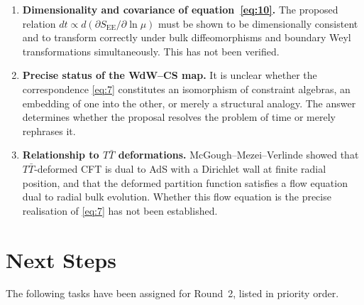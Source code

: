 \documentclass[11pt,a4paper]{article}
\begin{document}
\begin{enumerate}
  \item \textbf{Dimensionality and covariance of equation~\eqref{eq:10}.}
    The proposed relation $dt \propto d(\partial S_{\text{EE}}/\partial\ln\mu)$
    must be shown to be dimensionally consistent and to transform correctly
    under bulk diffeomorphisms and boundary Weyl transformations simultaneously.
    This has not been verified.

  \item \textbf{Precise status of the WdW--CS map.}
    It is unclear whether the correspondence \eqref{eq:7} constitutes an
    isomorphism of constraint algebras, an embedding of one into the other,
    or merely a structural analogy.
    The answer determines whether the proposal resolves the problem of time
    or merely rephrases it.

  \item \textbf{Relationship to $T\bar{T}$ deformations.}
    McGough--Mezei--Verlinde showed that $T\bar{T}$-deformed CFT is dual to
    AdS with a Dirichlet wall at finite radial position, and that the
    deformed partition function satisfies a flow equation dual to radial
    bulk evolution.
    Whether this flow equation is the precise realisation of \eqref{eq:7}
    has not been established.
\end{enumerate}

\section{Next Steps}
\label{sec:nextsteps}

The following tasks have been assigned for Round~2, listed in priority order.
\end{document}
